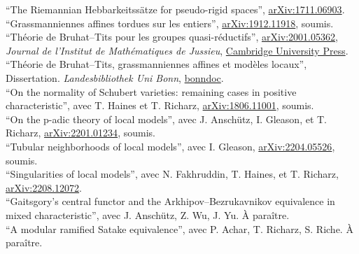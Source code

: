 \documentclass[12pt]{article} %
\begin{document}
 ``The Riemannian Hebbarkeitssätze for pseudo-rigid spaces'', \href{https://arxiv.org/abs/1711.06903}{arXiv:1711.06903}.  \\

 ``Grassmanniennes affines tordues sur les entiers'', \href{https://arxiv.org/abs/1912.11918}{arXiv:1912.11918}, soumis.\\

``Théorie de Bruhat--Tits pour les groupes quasi-réductifs'', \href{https://arxiv.org/abs/2001.05362}{arXiv:2001.05362}, \emph{Journal de l'Institut de Mathématiques de Jussieu}, \href{https://www.cambridge.org/core/journals/journal-of-the-institute-of-mathematics-of-jussieu/article/abs/theorie-de-bruhattits-pour-les-groupes-quasireductifs/324841C8B4D5E790CB9CBE984D32B13B}{Cambridge University Press}.\\

 ``Théorie de Bruhat--Tits, grassmanniennes affines et modèles locaux'', Dissertation. \emph{Landesbibliothek Uni Bonn}, \href{https://bonndoc.ulb.uni-bonn.de/xmlui/handle/20.500.11811/8641}{bonndoc}.\\

  ``On the normality of Schubert varieties: remaining cases in positive characteristic'', avec T. Haines et T. Richarz, \href{https://arxiv.org/abs/1806.11001}{arXiv:1806.11001}, soumis.\\

``On the p-adic theory of local models'', avec J. Anschütz, I. Gleason, et T. Richarz, \href{https://arxiv.org/abs/2201.01234}{arXiv:2201.01234}, soumis.\\

``Tubular neighborhoods of local models'', avec I. Gleason, \href{https://arxiv.org/abs/2204.05526}{arXiv:2204.05526}, soumis.  \\

 ``Singularities of local models'', avec N. Fakhruddin, T. Haines, et T. Richarz, \href{https://arxiv.org/abs/2208.12072}{arXiv:2208.12072}. \\


``Gaitsgory's central functor and the Arkhipov--Bezrukavnikov equivalence in mixed characteristic'', avec J. Anschütz, Z. Wu, J. Yu. À paraître. \\

``A modular ramified  Satake equivalence'', avec P. Achar, T. Richarz, S. Riche. À paraître. 
\end{document}
